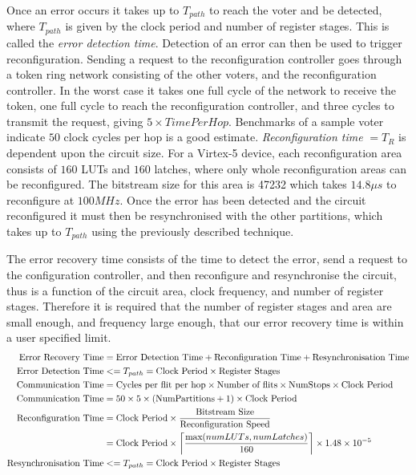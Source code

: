 \documentclass[12pt,final,oneside]{dwThesis} %
\begin{document}
   Once an error occurs it takes up to $T_{path}$ to reach the voter and be detected, where $T_{path}$ is given by the clock period and number of register stages. This is called the \textit{error detection time}. Detection of an error can then be used to trigger reconfiguration.
   Sending a request to the reconfiguration controller goes through a token ring network consisting of the other voters, and the reconfiguration controller. In the worst case it takes one full cycle of the network to receive the token, one full cycle to reach the reconfiguration controller, and three cycles to transmit the request, giving $5\times TimePerHop$. Benchmarks of a sample voter indicate $50$ clock cycles per hop is a good estimate.
   \textit{Reconfiguration time} $= T_R$ is dependent upon the circuit size. For a Virtex-5 device, each reconfiguration area consists of $160$ \acp{LUT} and $160$ latches, where only whole reconfiguration areas can be reconfigured. The bitstream size for this area is 47232 which takes $14.8\mu{}s$ to reconfigure at $100MHz$.
   Once the error has been detected and the circuit reconfigured it must then be resynchronised with the other partitions, which takes up to $T_{path}$ using the previously described technique.

   The error recovery time consists of the time to detect the error, send a request to the configuration controller, and then reconfigure and resynchronise the circuit, thus is a function of the circuit area, clock frequency, and number of register stages. Therefore it is required that the number of register stages and area are small enough, and frequency large enough, that our error recovery time is within a user specified limit.
   \begin{align}
      \mbox{Error Recovery Time} &=\mbox{Error Detection Time} + \mbox{Reconfiguration Time} + \mbox{Resynchronisation Time}\notag\\
      \mbox{Error Detection Time} &<= T_{path} = \mbox{Clock Period}\times\mbox{Register Stages}\notag\\
      \mbox{Communication Time} &= \mbox{Cycles per flit per hop}\times\mbox{Number of flits}\times\mbox{NumStops}\times \mbox{Clock Period}\notag\\
      \mbox{Communication Time} &= 50\times 5\times (\mbox{NumPartitions}+1)\times \mbox{Clock Period}\notag\\
      \mbox{Reconfiguration Time} &= \mbox{Clock Period}\times \frac{\mbox{Bitstream Size}}{\mbox{Reconfiguration Speed}}\notag\\
      &= \mbox{Clock Period}\times \left\lceil \frac{\mbox{max}(numLUTs, numLatches)}{160}\right\rceil\times 1.48\times10^{-5}\notag\\
      \mbox{Resynchronisation Time} &<= T_{path} = \mbox{Clock Period}\times\mbox{Register Stages}\notag\\
   \end{align}\cite{DiesselChange}
\end{document}
